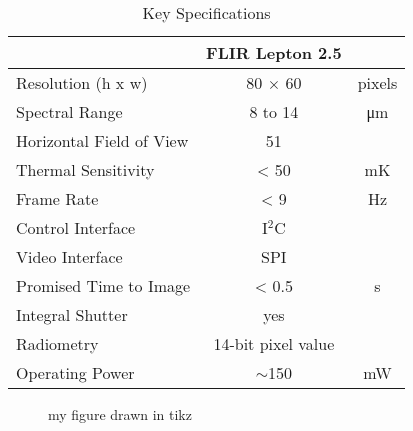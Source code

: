 \begin{table}[htb]
    \centering
    \label{tab:thcamspecifications}
    \caption{Key Specifications}
    \begin{tabular}{l c c}
        \hline
                                                            &   FLIR Lepton 2.5 &          \\
        \hline
        \rowcolor{aliceblue!85} Resolution (h x w)	        &   80 $\times$ 60  &   pixels  \\
        Spectral Range	                                    &   8  to 14        &   \si{\micro\meter}   \\
        \rowcolor{aliceblue!85} Horizontal Field of View	&   51              &   \degree \\
        Thermal Sensitivity	                                &   < 50            &   \si{\milli\kelvin}  \\
        \rowcolor{aliceblue!85} Frame Rate	                &   < 9             &   \si{\hertz} \\
        Control Interface	                                &   I$^{2}$C        &               \\
        \rowcolor{aliceblue!85} Video Interface	            &   SPI             &               \\
        Promised Time to Image	                            &   < 0.5           &   \si{\second}    \\
        \rowcolor{aliceblue!85} Integral Shutter		    &   yes             &   \\
        Radiometry	                                        &   14-bit pixel value  &           \\
        \rowcolor{aliceblue!85} Operating Power             &	$\sim$150       &   \si{\milli\watt} \\
        \hline
\end{tabular}
\end{table}

\begin{figure}[htb]
    \centering
    \resizebox{0.8\textwidth}{!}{}
    \caption{my figure drawn in tikz}\label{fig:myfigure}
\end{figure}
%
